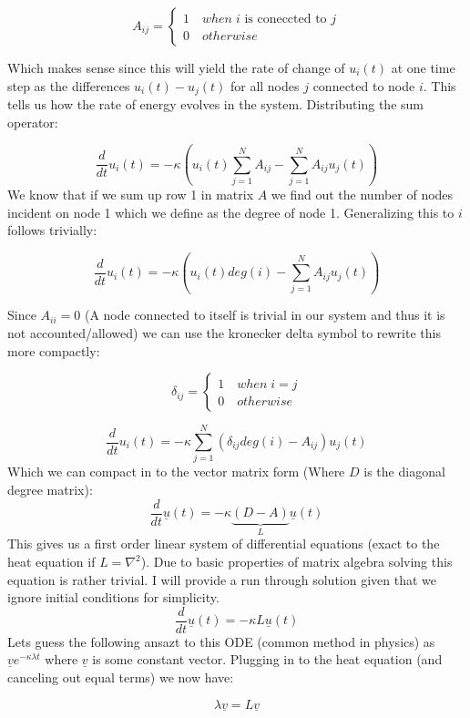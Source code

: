 \documentclass[10pt,twocolumn]{article}
\begin{document}
\[ A_{ij} = \begin{cases} 
   1 \quad when \; i \text{ is coneccted to } j \\
   0 \quad otherwise 
   \end{cases}
\]

Which makes sense since this will yield the rate of change of $u_{i}(t)$ at one time step as the differences $u_{i}(t) - u_{j}(t)$ for all nodes $j$ connected to node $i$. This tells us how the rate of energy evolves in the system.
\newline
Distributing the sum operator:

\[
\frac{d}{dt}u_{i}(t) = -\kappa \left( u_{i}(t) \sum_{j=1}^{N}A_{ij}-  \sum_{j=1}^{N}A_{ij}u_{j}(t) \right )
\]
We know that if we sum up row 1 in matrix $A$ we find out the number of nodes incident on node 1 which we define as the degree of node 1. Generalizing this to $i$ follows trivially:

\[
\frac{d}{dt}u_{i}(t) = -\kappa \left( u_{i}(t) deg(i)-  \sum_{j=1}^{N}A_{ij}u_{j}(t) \right )
\]

Since $A_{ii}=0$  (A node connected to itself is trivial in our system and thus it is not accounted/allowed) we can use the kronecker delta symbol to rewrite this more compactly:

\[ \delta_{ij} = \begin{cases} 
   1 \quad when \; i = j \\
   0 \quad otherwise 
   \end{cases}
\]

\[
\frac{d}{dt}u_{i}(t) = -\kappa \sum_{j=1}^{N}(\delta_{ij} deg(i) -A_{ij})u_{j}(t)
\]
Which we can compact in to the vector matrix form (Where $D$ is the diagonal degree matrix):
\[
\frac{d}{dt}\underline{u}(t) = -\kappa\underbrace{(D -A)}_{L}\underline{u}(t)
\]
This gives us a first order linear system of differential equations (exact to the heat equation if $L = \nabla^{2}$). Due to basic properties of matrix algebra solving this equation is rather trivial. I will provide a run through solution given that we ignore initial conditions for simplicity.
\[
\frac{d}{dt}\underline{u}(t) = -\kappa L\underline{u}(t)
\]
Lets guess the following ansazt to this ODE (common method in physics) as $\underline{v}e^{-\kappa\lambda t}$ where $\underline{v}$ is some constant vector. Plugging in to the heat equation (and canceling out equal terms) we now have:

\[
 \lambda \underline{v} = L \underline{v}
\]
\end{document}
